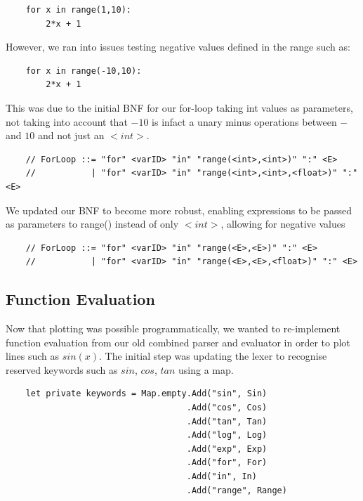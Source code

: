 \documentclass[a4paper, oneside, 11pt]{report}
\begin{document}
\begin{verbatim}
    for x in range(1,10):
        2*x + 1
\end{verbatim}

However, we ran into issues testing negative values defined in the range such as:

\begin{verbatim}
    for x in range(-10,10):
        2*x + 1
\end{verbatim}

This was due to the initial BNF for our for-loop taking int values as parameters, not taking into account that $-10$ is infact a unary minus operations between $-$ and $10$ and not just an $<int>$.

\begin{verbatim}
    // ForLoop ::= "for" <varID> "in" "range(<int>,<int>)" ":" <E>
    //           | "for" <varID> "in" "range(<int>,<int>,<float>)" ":" <E>
\end{verbatim}



We updated our BNF to become more robust, enabling expressions to be passed as parameters to range() instead of only $<int>$, allowing for negative values

\begin{verbatim}
    // ForLoop ::= "for" <varID> "in" "range(<E>,<E>)" ":" <E>
    //           | "for" <varID> "in" "range(<E>,<E>,<float>)" ":" <E>
\end{verbatim}

\subsection{Function Evaluation}

Now that plotting was possible programmatically, we wanted to re-implement function evaluation from our old combined parser and evaluator in order to plot lines such as $sin(x)$. The initial step was updating the lexer to recognise reserved keywords such as $sin$, $cos$, $tan$ using a map.

\begin{verbatim}
    let private keywords = Map.empty.Add("sin", Sin)
                                    .Add("cos", Cos)
                                    .Add("tan", Tan)
                                    .Add("log", Log)
                                    .Add("exp", Exp)
                                    .Add("for", For)
                                    .Add("in", In)
                                    .Add("range", Range)
\end{verbatim}
\end{document}
